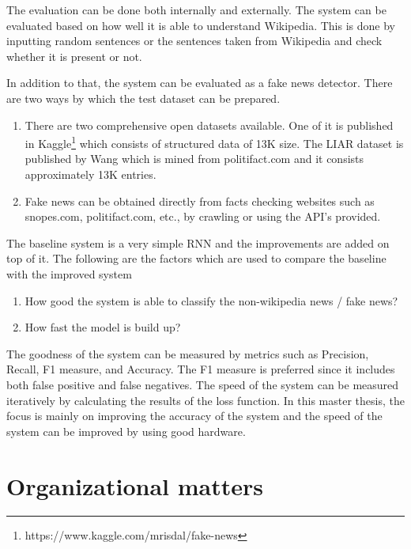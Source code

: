 \documentclass[a4paper, 11pt]{article}
\begin{document}
The evaluation can be done both internally and externally. The system can be evaluated based on how well it is able to understand Wikipedia. This is done by inputting random sentences or the sentences taken from Wikipedia and check whether it is present or not. 

In addition to that, the system can be evaluated as a fake news detector. There are two ways by which the test dataset can be prepared. 

\begin{enumerate}
\item There are two comprehensive open datasets available. One of it is published in Kaggle\footnote{https://www.kaggle.com/mrisdal/fake-news} which consists of structured data of 13K size. The LIAR dataset is published by Wang \cite{Wang2017} which is mined from politifact.com and it consists approximately 13K entries.
\item Fake news can be obtained directly from facts checking websites such as snopes.com, politifact.com, etc., by crawling or using the API's provided.
\end{enumerate}

The baseline system is a very simple RNN and the improvements are added on top of it. The following are the factors which are used to compare the baseline with the improved system
\begin{enumerate}
\item How good the system is able to classify the non-wikipedia news / fake news?
\item How fast the model is build up?
\end{enumerate}

The goodness of the system can be measured by metrics such as Precision, Recall, F1 measure, and Accuracy. The F1 measure is preferred since it includes both false positive and false negatives. The speed of the system can be measured iteratively by calculating the results of the loss function. In this master thesis, the focus is mainly on improving the accuracy of the system and the speed of the system can be improved by using good hardware.  

\newpage

\section{Organizational matters}
\end{document}
